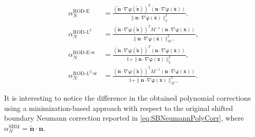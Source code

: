 \documentclass{article}
\renewcommand{\phi}{\varphi}
\begin{document}
\begin{subequations}\label{eq:alpha_all_NBC}
\begin{align}
\alpha_N^{\text{ROD-E}} &= \frac{(\tilde{\boldsymbol{n}} \cdot \nabla \boldsymbol{\phi}(\tilde{\boldsymbol{x}}))^T (\boldsymbol{n} \cdot \nabla \boldsymbol{\phi}(\bar{\boldsymbol{x}}))}{\|\boldsymbol{n} \cdot \nabla \boldsymbol{\phi}(\bar{\boldsymbol{x}})\|_2^2}, \\[10pt]
\alpha_N^{\text{ROD-}L^2} &= \frac{(\tilde{\boldsymbol{n}} \cdot \nabla \boldsymbol{\phi}(\tilde{\boldsymbol{x}}))^T M^{-1} (\boldsymbol{n} \cdot \nabla \boldsymbol{\phi}(\bar{\boldsymbol{x}}))}{\|\boldsymbol{n} \cdot \nabla \boldsymbol{\phi}(\bar{\boldsymbol{x}})\|_{M^{-1}}^2}, \\[10pt]
\alpha_N^{\text{ROD-E-w}} &= \frac{(\tilde{\boldsymbol{n}} \cdot \nabla \boldsymbol{\phi}(\tilde{\boldsymbol{x}}))^T (\boldsymbol{n} \cdot \nabla \boldsymbol{\phi}(\bar{\boldsymbol{x}}))}{1 + \|\boldsymbol{n} \cdot \nabla \boldsymbol{\phi}(\bar{\boldsymbol{x}})\|_2^2}, \\[10pt]
\alpha_N^{\text{ROD-}L^2\text{-w}} &= \frac{(\tilde{\boldsymbol{n}} \cdot \nabla \boldsymbol{\phi}(\tilde{\boldsymbol{x}}))^T M^{-1} (\boldsymbol{n} \cdot \nabla \boldsymbol{\phi}(\bar{\boldsymbol{x}}))}{1 + \|\boldsymbol{n} \cdot \nabla \boldsymbol{\phi}(\bar{\boldsymbol{x}})\|_{M^{-1}}^2}.
\end{align}
\end{subequations}

It is interesting to notice the difference in the obtained polynomial corrections using a minimization-based approach with respect to the original shifted boundary Neumann correction reported in \eqref{eq:SBNeumannPolyCorr}, where $\alpha_N^{\text{SBM}} = \tilde{\boldsymbol{n}}\cdot\boldsymbol{n}$.
\end{document}
